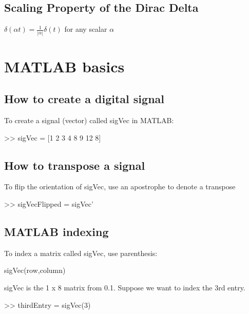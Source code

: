 \documentclass[11pt]{article}
\begin{document}
\subsection{Scaling Property of the Dirac Delta}

$\delta(\alpha t)= \frac{1}{|\alpha|} \delta(t)$ for any scalar $\alpha$

\vspace{80mm}

\section{MATLAB basics}

\subsection{How to create a digital signal}

To create a signal (vector) called sigVec in MATLAB:
\begin{center}
{ >> sigVec = [1 2 3 4 8 9 12 8]}


\end{center}

\subsection{How to transpose a signal}

To flip the orientation of sigVec, use an apostrophe to denote a transpose


\begin{center}
{ >> sigVecFlipped = sigVec' }

\end{center}

\subsection{MATLAB indexing}
To index a matrix called sigVec, use parenthesis:

\begin{center}
sigVec(row,column)

\end{center}

\vspace{5mm}

sigVec is the 1 x 8 matrix from 0.1. Suppose we want to index the 3rd entry.
\begin{center}
{>> thirdEntry = sigVec(3)}

\end{center}
\end{document}
